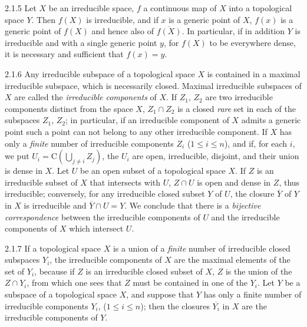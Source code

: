 \begin{env}{2.1.5}
\label{env-0.2.1.5}
Let $X$ be an irreducible space, $f$ a continuous map of $X$ into a topological space $Y$.
Then $f(X)$ is irreducible, and if $x$ is a generic point of $X$, $f(x)$ is a generic point
of $f(X)$ and hence also of $\overline{f(X)}$. In particular, if in addition $Y$ is
irreducible and with a single generic point $y$, for $f(X)$ to be everywhere dense, it is
necessary and sufficient that $f(x)=y$.
\end{env}

\begin{env}{2.1.6}
\label{env-0.2.1.6}
Any irreducible subspace of a topological space $X$ is contained in a maximal irreducible
subspace, which is necessarily closed. Maximal irreducible subspaces of $X$ are called the
\emph{irreducible components} of $X$. If $Z_1$, $Z_2$ are two irreducible components distinct
from the space $X$, $Z_1\cap Z_2$ is a closed \emph{rare} set in each of the subspaces $Z_1$,
$Z_2$; in particular, if an irreducible component of $X$ admits a generic point
 such a point can not belong to any other irreducible component. If $X$ has
only a \emph{finite} number of irreducible components $Z_i$ ($1\leqslant i\leqslant n$), and
if, for each $i$, we put $U_i=\mathrm{C}(\bigcup_{j\neq i}Z_j)$, the $U_i$ are open,
irreducible, disjoint, and their union is dense in $X$. Let $U$ be an open subset of a
topological space $X$. If $Z$ is an irreducible subset of $X$ that intersects with $U$,
$Z\cap U$ is open and dense in $Z$, thus irreducible; conversely, for any irreducible closed
subset $Y$ of $U$, the closure $\overline{Y}$ of $Y$ in $X$ is irreducible and
$\overline{Y}\cap U=Y$. We conclude that there is a \emph{bijective correspondence} between
the irreducible components of $U$ and the irreducible components of $X$ which intersect $U$.
\end{env}

\begin{env}{2.1.7}
\label{env-0.2.1.7}
If a topological space $X$ is a union of a \emph{finite} number of irreducible closed
subspaces $Y_i$, the irreducible components of $X$ are the maximal elements of the set of
$Y_i$, because if $Z$ is an irreducible closed subset of $X$, $Z$ is the union of the
$Z\cap Y_i$, from which one sees that $Z$ must be contained in one of the $Y_i$. Let $Y$ be a
subspace of a topological space $X$, and suppose that $Y$ has only a finite number of
irreducible components $Y_i$, ($1\leqslant i\leqslant n$); then the closures $\overline{Y_i}$
in $X$ are the irreducible components of $Y$.
\end{env}


